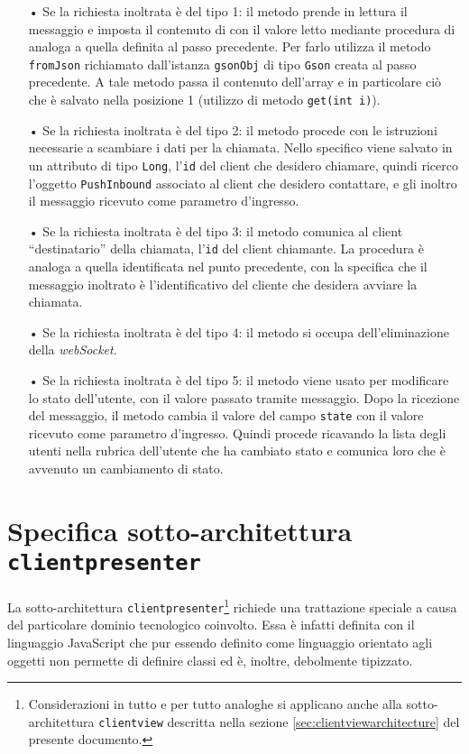 \begin{description}
	\begin{itemize}
		\item[•]Se la richiesta inoltrata è del tipo 1: il metodo prende in lettura il messaggio e imposta il contenuto di  con il valore letto mediante procedura di  analoga a quella definita al passo precedente. Per farlo utilizza il metodo \texttt{fromJson} richiamato dall'istanza \texttt{gsonObj} di tipo \texttt{Gson} creata al passo precedente. A tale metodo passa il contenuto dell'array e in particolare ciò che è salvato nella posizione 1 (utilizzo di metodo \texttt{get(int i)}).
		\item[•]Se la richiesta inoltrata è del tipo 2: il metodo procede con le istruzioni necessarie a scambiare i dati per la chiamata. Nello specifico viene salvato in un attributo di tipo \texttt{Long}, l'\texttt{id} del client che desidero chiamare, quindi ricerco l'oggetto \texttt{PushInbound} associato al client che desidero contattare, e gli inoltro il messaggio ricevuto come parametro d'ingresso.
		\item[•]Se la richiesta inoltrata è del tipo 3: il metodo comunica al client ``destinatario'' della chiamata, l'\texttt{id} del client chiamante. La procedura è analoga a quella identificata nel punto precedente, con la specifica che il messaggio inoltrato è l'identificativo del cliente che desidera avviare la chiamata.
		\item[•]Se la richiesta inoltrata è del tipo 4: il metodo si occupa dell'eliminazione della \textit{webSocket}.
		\item[•]Se la richiesta inoltrata è del tipo 5: il metodo viene usato per modificare lo stato dell'utente, con il valore passato tramite messaggio. Dopo la ricezione del messaggio, il metodo cambia il valore del campo \texttt{state} con il valore ricevuto come parametro d'ingresso. Quindi procede ricavando la lista degli utenti nella rubrica dell'utente che ha cambiato stato e comunica loro che è avvenuto un cambiamento di stato.
	\end{itemize}
\end{description}

\clearpage

\section{Specifica sotto-architettura \texttt{clientpresenter}}\label{sec:clientpresenterarchitecture}

La sotto-architettura \texttt{clientpresenter}\footnote{%
  Considerazioni in tutto e per tutto analoghe si applicano anche alla sotto-architettura \texttt{clientview} descritta nella sezione \vref{sec:clientviewarchitecture} del presente documento.
}
richiede una trattazione speciale a causa del particolare dominio tecnologico coinvolto. Essa è infatti definita con il linguaggio JavaScript che pur essendo definito come linguaggio orientato agli oggetti non permette di definire classi ed è, inoltre, debolmente tipizzato.


